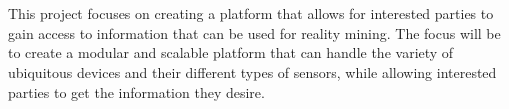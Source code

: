 \\\\
This project focuses on creating a platform that allows for interested parties to gain access to information that can be used for reality mining. The focus will be to create a modular and scalable platform that can handle the variety of ubiquitous devices and their different types of sensors, while allowing interested parties to get the information they desire.






